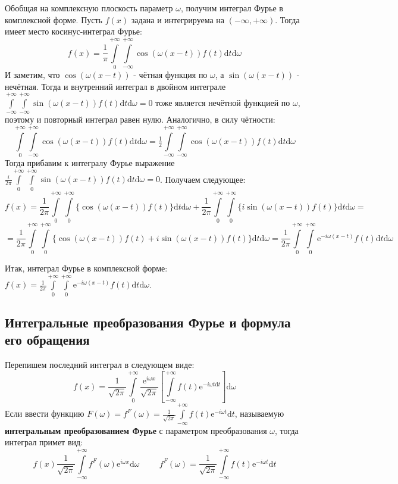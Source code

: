\documentclass[12pt, a4paper]{article}
\newcommand{\di}{\mathrm{d}}
\begin{document}
Обобщая на комплексную плоскость параметр $\omega$, получим интеграл Фурье в комплексной форме. Пусть $f(x)$ задана и интегрируема на $(-\infty, +\infty)$. Тогда имеет место косинус-интеграл Фурье:
\[f(x) = \frac{1}{\pi} \int \limits_0^{+\infty} \int \limits_{-\infty}^{+\infty} \cos (\omega (x-t)) f(t) \di t \di \omega \]
И заметим, что $\cos (\omega (x-t))$ - чётная функция по $\omega$, а $\sin (\omega (x-t))$ - нечётная. Тогда и внутренний интеграл в двойном интеграле $\int \limits_{-\infty}^{+\infty} \int \limits_{-\infty}^{+\infty} \sin (\omega (x-t)) f(t) \di t \di \omega = 0$ тоже является нечётной функцией по $\omega$, поэтому и повторный интеграл равен нулю. Аналогично, в силу чётности:
\[\int \limits_0^{+\infty} \int \limits_{-\infty}^{+\infty} \cos (\omega (x-t)) f(t) \di t \di \omega = \tfrac{1}{2} \int \limits_{-\infty}^{+\infty} \int \limits_{-\infty}^{+\infty} \cos (\omega (x-t)) f(t) \di t \di \omega \]
Тогда прибавим к интегралу Фурье выражение $\frac{i}{2 \pi} \int \limits_0^{+\infty} \int \limits_0^{+\infty} \sin (\omega (x-t)) f(t) \di t \di \omega = 0$. Получаем следующее:
\[f(x) = \frac{1}{2\pi} \int \limits_0^{+\infty} \int \limits_0^{+\infty} \{\cos (\omega (x-t)) f(t) \} \di t \di \omega + \frac{1}{2\pi} \int \limits_0^{+\infty} \int \limits_0^{+\infty} \{i \sin (\omega (x-t)) f(t) \} \di t \di \omega = \]
\[= \frac{1}{2\pi} \int \limits_0^{+\infty} \int \limits_0^{+\infty} \{\cos (\omega (x-t)) f(t) + i \sin (\omega (x-t)) f(t) \} \di t \di \omega = \frac{1}{2\pi} \int \limits_0^{+\infty} \int \limits_0^{+\infty} \mathrm{e}^{-i\omega (x-t)} f(t) \di t \di \omega \]

Итак, интеграл Фурье в комплексной форме: $f(x) = \frac{1}{2\pi} \int \limits_0^{+\infty} \int \limits_0^{+\infty} \mathrm{e}^{-i\omega (x-t)} f(t) \di t \di \omega$.

\subsection{Интегральные преобразования Фурье и формула его обращения}

Перепишем последний интеграл в следующем виде:
\[f(x) = \frac{1}{\sqrt{2\pi}} \int \limits_0^{+\infty} \frac{\mathrm{e}^{i\omega x}}{\sqrt{2\pi}} \left[ \int \limits_{-\infty}^{+\infty} f(t) \mathrm{e}^{-i\omega t \di t} \right] \di \omega \]
Если ввести функцию $F(\omega) = f^F(\omega) = \frac{1}{\sqrt{2\pi}} \int \limits_{-\infty}^{+\infty} f(t) \mathrm{e}^{-i\omega t} \di t$, называемую \textbf{интегральным преобразованием Фурье} с параметром преобразования $\omega$, тогда интеграл примет вид:
\[f(x) \frac{1}{\sqrt{2\pi}} \int \limits_{-\infty}^{+\infty} f^F(\omega) \mathrm{e}^{i\omega x} \di \omega \hspace{1cm} f^F(\omega) = \frac{1}{\sqrt{2\pi}} \int \limits_{-\infty}^{+\infty} f(t) \mathrm{e}^{-i\omega t} \di t \]
\end{document}
